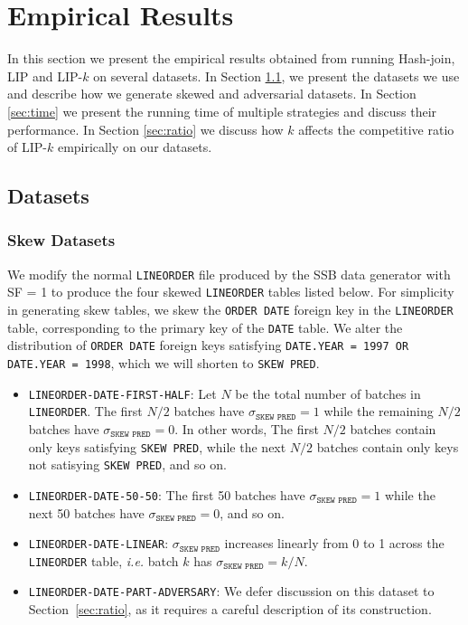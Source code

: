 \section{Empirical Results}\label{sec:experiment}

In this section we present the empirical results obtained from running Hash-join, LIP and LIP-$k$ on several datasets. In Section \ref{sec:dataset}, we present the datasets we use and describe how we generate skewed and adversarial datasets. In Section \ref{sec:time} we present the running time of multiple strategies and discuss their performance. In Section \ref{sec:ratio} we discuss how $k$ affects the competitive ratio of LIP-$k$ empirically on our datasets.

\subsection{Datasets}
\label{sec:dataset}


\subsubsection{Skew Datasets}

We modify the normal \texttt{LINEORDER} file produced by the SSB data generator with SF = 1 to produce the four skewed \texttt{LINEORDER} tables listed below.
For simplicity in generating skew tables, we skew the \texttt{ORDER DATE} foreign key in the \texttt{LINEORDER} table, corresponding to the primary key of the \texttt{DATE} table. 
We alter the distribution of \texttt{ORDER DATE} foreign keys satisfying \texttt{DATE.YEAR = 1997 OR DATE.YEAR = 1998}, which we will shorten to \texttt{SKEW PRED}.

\begin{itemize}
    \item \texttt{LINEORDER-DATE-FIRST-HALF}: Let $N$ be the total number of batches in \texttt{LINEORDER}. 
    The first $N/2$ batches have $\sigma_{\texttt{SKEW PRED}} = 1$ while the remaining $N/2$ batches have $\sigma_{\texttt{SKEW PRED}} = 0$.
    In other words, The first $N/2$ batches contain only keys satisfying \texttt{SKEW PRED}, 
    while the next $N/2$ batches contain only keys not satisying \texttt{SKEW PRED}, 
    and so on. 

    \item \texttt{LINEORDER-DATE-50-50}: The first 50 batches have $\sigma_{\texttt{SKEW PRED}} = 1$ while the next 50 batches have $\sigma_{\texttt{SKEW PRED}} = 0$, and so on.

    \item \texttt{LINEORDER-DATE-LINEAR}: $\sigma_{\texttt{SKEW PRED}}$ increases linearly from 0 to 1 across the \texttt{LINEORDER} table, 
    {\it i.e.} batch $k$ has $\sigma_{\texttt{SKEW PRED}} = k/N$.

    \item \texttt{LINEORDER-DATE-PART-ADVERSARY}: We defer discussion on this dataset to Section~\ref{sec:ratio}, 
    as it requires a careful description of its construction.

\end{itemize} 


